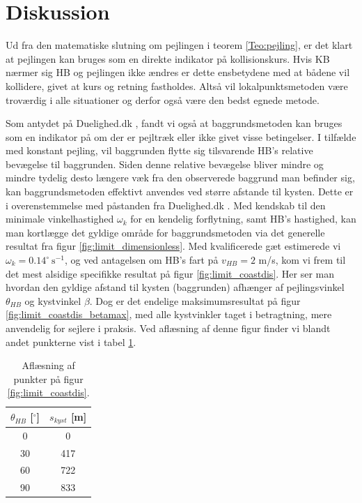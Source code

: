 \documentclass[%
 reprint,
nofootinbib,
aps,
]{revtex4-1}
\begin{document}
\section{Diskussion}
Ud fra den matematiske slutning om pejlingen i teorem \ref{Teo:pejling}, er det klart at pejlingen kan bruges som en direkte indikator på kollisionskurs. Hvis KB nærmer sig HB og pejlingen ikke ændres er dette ensbetydene med at bådene vil kollidere, givet at kurs og retning fastholdes. Altså vil lokalpunktsmetoden være troværdig i alle situationer og derfor også være den bedst egnede metode. \par
Som antydet på Duelighed.dk \cite{duelighed}, fandt vi også at baggrundsmetoden kan bruges som en indikator på om der er pejltræk eller ikke givet visse betingelser. I tilfælde med konstant pejling, vil baggrunden flytte sig tilsvarende HB's relative bevægelse til baggrunden. Siden denne relative bevægelse bliver mindre og mindre tydelig desto længere væk fra den observerede baggrund man befinder sig, kan baggrundsmetoden effektivt anvendes ved større afstande til kysten. Dette er i overenstemmelse med påstanden fra Duelighed.dk \cite{duelighed}. Med kendskab til den minimale vinkelhastighed $\omega_k$ for en kendelig forflytning, samt HB's hastighed, kan man kortlægge det gyldige område for baggrundsmetoden via det generelle resultat fra figur \ref{fig:limit_dimensionless}. Med kvalificerede gæt estimerede vi $\omega_k = 0.14^{\circ}\ \text{s}^{-1}$, og ved antagelsen om HB's fart på $v_{HB} = 2$ m/s, kom vi frem til det mest alsidige specifikke resultat på figur \ref{fig:limit_coastdis}. Her ser man hvordan den gyldige afstand til kysten (baggrunden) afhænger af pejlingsvinkel $\theta_{HB}$ og kystvinkel $\beta$. Dog er det endelige maksimumsresultat på figur \ref{fig:limit_coastdis_betamax}, med alle kystvinkler taget i betragtning, mere anvendelig for sejlere i praksis. Ved aflæsning af denne figur finder vi blandt andet punkterne vist i tabel \ref{tab:valid_area}.
\begin{table}[H]
 \begin{center}
 \caption{Aflæsning af punkter på figur \ref{fig:limit_coastdis}.}
 \begin{tabular}{|c|c|} \hline
 $\theta_{HB}$ [$^{\circ}$] & $s_{kyst}$ [m]  \\ \hline
 0 & 0 \\ \hline
 30 & 417 \\ \hline
 60 & 722  \\ \hline
 90 & 833 \\ \hline
 \end{tabular}
 \end{center}
 \label{tab:valid_area}
\end{table}
\end{document}
